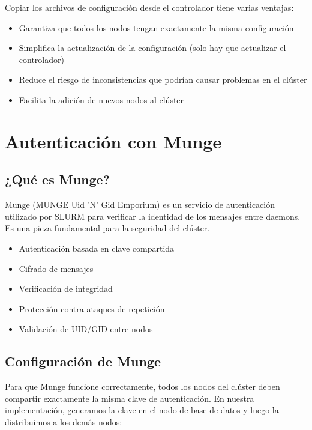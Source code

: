\documentclass[12pt,a4paper]{article}
\begin{document}
\begin{warningbox}
Copiar los archivos de configuración desde el controlador tiene varias ventajas:
\begin{itemize}
    \item Garantiza que todos los nodos tengan exactamente la misma configuración
    \item Simplifica la actualización de la configuración (solo hay que actualizar el controlador)
    \item Reduce el riesgo de inconsistencias que podrían causar problemas en el clúster
    \item Facilita la adición de nuevos nodos al clúster
\end{itemize}
\end{warningbox}

\section{Autenticación con Munge}

\subsection{¿Qué es Munge?}

Munge (MUNGE Uid 'N' Gid Emporium) es un servicio de autenticación utilizado por SLURM para verificar la identidad de los mensajes entre daemons. Es una pieza fundamental para la seguridad del clúster.

\begin{infobox}
\begin{itemize}
    \item Autenticación basada en clave compartida
    \item Cifrado de mensajes
    \item Verificación de integridad
    \item Protección contra ataques de repetición
    \item Validación de UID/GID entre nodos
\end{itemize}
\end{infobox}

\subsection{Configuración de Munge}

Para que Munge funcione correctamente, todos los nodos del clúster deben compartir exactamente la misma clave de autenticación. En nuestra implementación, generamos la clave en el nodo de base de datos y luego la distribuimos a los demás nodos:
\end{document}
